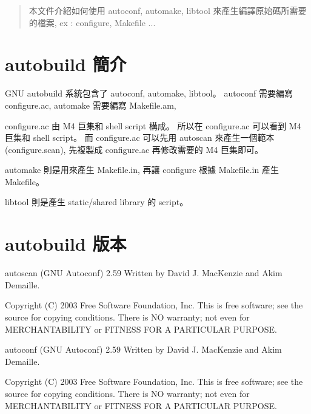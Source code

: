 \documentclass[12pt,a4]{article}
\begin{document}
\renewcommand{\abstractname}{摘要}
\renewcommand{\figurename}{圖}
\renewcommand{\contentsname}{目錄}
\begin{CJK}{UTF8}{bsmi} %



\newpage
\tableofcontents
{}
\newpage


\begin{abstract}
本文件介紹如何使用 autoconf, automake, libtool
來產生編譯原始碼所需要的檔案, ex : configure, Makefile ...
\end{abstract}
\newpage

\section{autobuild 簡介}
GNU autobuild 系統包含了 autoconf, automake, libtool。
autoconf 需要編寫 configure.ac,
automake 需要編寫 Makefile.am,

configure.ac 由 M4 巨集和 shell script 構成。
所以在 configure.ac 可以看到 M4 巨集和 shell script。
而 configure.ac 可以先用 autoscan 來產生一個範本 (configure.scan),
先複製成 configure.ac 再修改需要的 M4 巨集即可。

automake 則是用來產生 Makefile.in, 再讓 configure 根據 Makefile.in
產生 Makefile。

libtool 則是產生 static/shared library 的 script。

\section{autobuild 版本}

autoscan (GNU Autoconf) 2.59
Written by David J. MacKenzie and Akim Demaille.

Copyright (C) 2003 Free Software Foundation, Inc.
This is free software; see the source for copying conditions.  There is NO
warranty; not even for MERCHANTABILITY or FITNESS FOR A PARTICULAR PURPOSE.


autoconf (GNU Autoconf) 2.59
Written by David J. MacKenzie and Akim Demaille.

Copyright (C) 2003 Free Software Foundation, Inc.
This is free software; see the source for copying conditions.  There is NO
warranty; not even for MERCHANTABILITY or FITNESS FOR A PARTICULAR PURPOSE.




\end{CJK}
\end{document}
